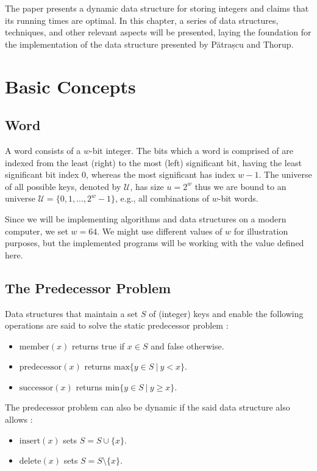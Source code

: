 The \cite{patrascu2014dynamic} paper presents a dynamic data structure for storing integers and claims that its running times are optimal.
In this chapter, a series of data structures, techniques, and other relevant aspects will be presented, laying the foundation for the implementation of the data structure presented by Pătrașcu and Thorup.

\section{Basic Concepts}

\subsection{Word} \label{sec:word}
A word consists of a $w$-bit integer.
The bits which a word is comprised of are indexed from the least (right) to the most (left) significant bit, having the least significant bit index $0$, whereas the most significant has index $w-1$.
The universe of all possible keys, denoted by $\mathcal U$, has size $u = 2^{w}$ thus we are bound to an universe $\mathcal U = \{0, 1, ..., 2^{w}-1\}$, e.g., all combinations of $w$-bit words.

Since we will be implementing algorithms and data structures on a modern computer, we set $w = 64$. We might use different values of $w$ for illustration purposes, but the implemented programs will be working with the value defined here. 

\subsection{The Predecessor Problem} \label{sec:predecessorProblem}
Data structures that maintain a set $S$ of (integer) keys and enable the following operations are said to solve the static predecessor problem \cite{beame1999optimal}:
\begin{itemize}
    \item
    $\text{member}(x)$ returns {\ttfamily true} if $x \in S$ and {\ttfamily false} otherwise.
    
    \item
    $\text{predecessor}(x)$ returns $\text{max}\{y\in S\ |\ y < x\}$.
    
    \item
    $\text{successor}(x)$ returns $\text{min}\{y\in S\ |\ y \geq x\}$.
\end{itemize}

The predecessor problem can also be dynamic if the said data structure also allows \cite{beame1999optimal}:
\begin{itemize}
    \item
    $\text{insert}(x)$ sets $S=S \cup \{x\}$.
    
    \item
    $\text{delete}(x)$ sets $S=S \setminus \{x\}$.
\end{itemize}

